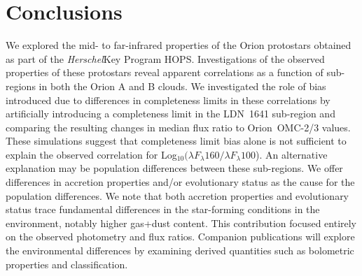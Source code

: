 \documentclass[manuscript]{aastex}
\newcommand{\herschel}{{\em Herschel}}
\newcommand{\clrb}{Log$_{10}(\lambda F_\lambda160/\lambda F_\lambda100$)}
\begin{document}
\section{Conclusions}
\label{sec:conc}

We explored the mid- to far-infrared properties of the Orion protostars obtained as part of the \herschel Key Program HOPS. Investigations of the observed properties of these protostars reveal apparent correlations as a function of sub-regions in both the Orion A and B clouds.  We investigated the role of bias introduced due to differences in completeness limits in these correlations by artificially introducing a completeness limit in the LDN~1641 sub-region and comparing the resulting changes in median flux ratio to Orion~OMC-2/3 values. These simulations suggest that completeness limit bias alone is not sufficient to explain the observed correlation for \clrb.  An alternative explanation may be population differences between these sub-regions. We offer
differences in accretion properties and/or evolutionary status as the cause for the population differences. We note that both accretion properties and evolutionary status trace fundamental differences in the star-forming conditions in the environment, notably higher gas+dust content.  This contribution focused entirely on the observed photometry and flux ratios.   Companion publications will explore the environmental differences by examining derived quantities such as bolometric properties and classification.
\end{document}
